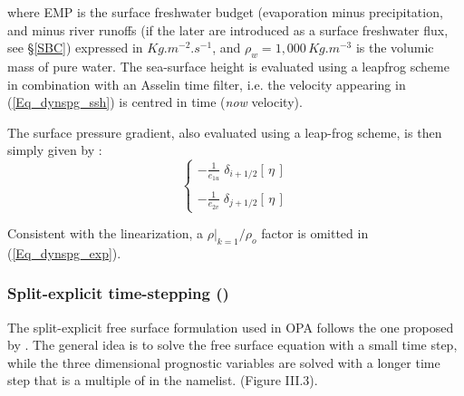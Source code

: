 \documentclass[NEMO_book]{subfiles}
\begin{document}
where EMP is the surface freshwater budget (evaporation minus precipitation, and minus river runoffs (if the later are introduced as a surface freshwater flux, see \S\ref{SBC}) expressed in $Kg.m^{-2}.s^{-1}$, and $\rho _w =1,000\,Kg.m^{-3}$ is the volumic mass of pure water. The sea-surface height is evaluated using a leapfrog scheme in combination with an Asselin time filter, i.e. the velocity appearing in (\ref{Eq_dynspg_ssh}) is centred in time (\textit{now} velocity). 

The surface pressure gradient, also evaluated using a leap-frog scheme, is then simply given by :
\begin{equation} \label{Eq_dynspg_exp}
\left\{ \begin{aligned}
 - \frac{1}    						{e_{1u}} \;	\delta _{i+1/2} \left[  \,\eta\,  \right] 	\\
 \\
 - \frac{1}    						{e_{2v}} \;	\delta _{j+1/2} \left[  \,\eta\,  \right]  
\end{aligned} \right.
\end{equation} 

Consistent with the linearization, a $\left. \rho \right|_{k=1} / \rho _o$ factor is omitted in (\ref{Eq_dynspg_exp}). 

\subsubsection{Split-explicit time-stepping ()}
\label{DYN_spg_ts}
The split-explicit free surface formulation used in OPA follows the one proposed by \citet{Griffies2004}. The general idea is to solve the free surface equation with a small time step, while the three dimensional prognostic variables are solved with a longer time step that is a multiple of 
in the   namelist. 
(Figure III.3). 
\end{document}
